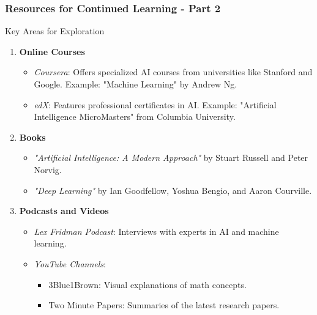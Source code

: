 \documentclass[aspectratio=169]{beamer}
\begin{document}
\begin{frame}[fragile]
    \frametitle{Resources for Continued Learning - Part 2}
    \begin{block}{Key Areas for Exploration}
        \begin{enumerate}
            \item \textbf{Online Courses}
                \begin{itemize}
                    \item \textit{Coursera}: Offers specialized AI courses from universities like Stanford and Google. Example: "Machine Learning" by Andrew Ng.
                    \item \textit{edX}: Features professional certificates in AI. Example: "Artificial Intelligence MicroMasters" from Columbia University.
                \end{itemize}
            \item \textbf{Books}
                \begin{itemize}
                    \item \textit{"Artificial Intelligence: A Modern Approach"} by Stuart Russell and Peter Norvig.
                    \item \textit{"Deep Learning"} by Ian Goodfellow, Yoshua Bengio, and Aaron Courville.
                \end{itemize}
            \item \textbf{Podcasts and Videos}
                \begin{itemize}
                    \item \textit{Lex Fridman Podcast}: Interviews with experts in AI and machine learning.
                    \item \textit{YouTube Channels}: 
                        \begin{itemize}
                            \item 3Blue1Brown: Visual explanations of math concepts.
                            \item Two Minute Papers: Summaries of the latest research papers.
                        \end{itemize}
                \end{itemize}
        \end{enumerate}
    \end{block}
\end{frame}
\end{document}
